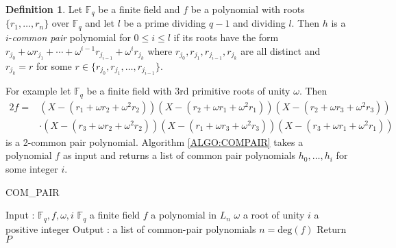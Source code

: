 \documentclass{article}
\newcounter{dummy} \numberwithin{dummy}{section}
\theoremstyle{plain}
\theoremstyle{definition}
\newtheorem{mydef}[dummy]{Definition}
\def\Fq {{ \mathbb{F} _ {q} }}
\def\deg {{ \mathrm{deg}}}
\begin{document}
		\begin{mydef}
		\label{DEF:ComPair}
		    Let $\Fq$ be a finite field and $f$ be a polynomial with roots $\{r_1,\ldots, r_{n} \}$ over $\Fq$ and let $l$ be a prime dividing $q-1$ and dividing $l$. Then $h$ is a $i$-\emph{common pair} polynomial for $0 \leq i \leq l$ if its roots have the form $r_{j_0} + \omega r_{j_1} + \cdots + \omega^{i-1}r_{j_{i-1}} + \omega^{i}r_{j_{k}}$ where $r_{j_0}, r_{j_1}, r_{j_{i-1}}, r_{j_{k}}$ are all distinct and $r_{j_{k}}=r$ for some $r \in \{ r_{j_0}, r_{j_1},\ldots, r_{j_{i-1}} \}$. 
		\end{mydef}
		
		For example let $\Fq$ be a finite field with 3rd primitive roots of unity $\omega$. Then 
		\begin{alignat*}{2}
		f=&(X-(r_1+\omega r_2 + \omega^2 r_2))(X-(r_2+\omega r_1 + \omega^2 r_1))(X-(r_2+\omega r_3 + \omega^2 r_3)) \\
		  & \cdot(X-(r_3+\omega r_2 + \omega^2 r_2))(X-(r_1+\omega r_3 + \omega^2 r_3))(X-(r_3+\omega r_1 + \omega^2 r_1)) 
		\end{alignat*}
		is a 2-common pair polynomial. Algorithm \ref{ALGO:COMPAIR} takes a polynomial $f$ as input and returns a list of common pair polynomials $h_0,\ldots,h_i$ for some integer $i$.
    \begin{singlespace}
    \begin{algorithm}[H]
		\DontPrintSemicolon
    \label{ALGO:COMPAIR}
    \caption{COM\_PAIR}
        Input : $\Fq,f,\omega,i$ \;
				\hspace{2mm} $\Fq$ a finite field \;
				\hspace{2mm} $f$ a polynomial in $L_n$ \;
				\hspace{2mm} $\omega$ a root of unity \;
				\hspace{2mm} $i$ a positive integer \;
		    Output : a list of common-pair polynomials \;
        $n=\deg(f)$ \;
        Return $P$ \;
    \end{algorithm}
    \end{singlespace} 
		\vspace{5mm}	
		
\end{document}
